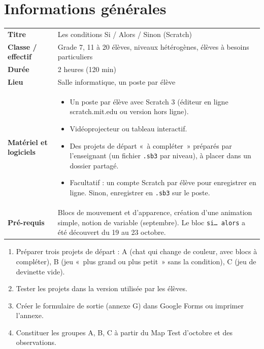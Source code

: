 \documentclass[11pt,a4paper]{article}
\begin{document}

\section{Informations générales}
\begin{tabularx}{\linewidth}{>{\bfseries}p{3.6cm}Y}
\toprule
Titre & Les conditions Si / Alors / Sinon (Scratch)\\
Classe / effectif & Grade 7, 11 à 20 élèves, niveaux hétérogènes, élèves à besoins particuliers\\
Durée & 2 heures (120 min)\\
Lieu & Salle informatique, un poste par élève\\
Matériel et logiciels &
\begin{itemize}
 \item Un poste par élève avec Scratch 3 (éditeur en ligne scratch.mit.edu ou version hors ligne).
 \item Vidéoprojecteur ou tableau interactif.
 \item Des projets de départ «~à compléter~» préparés par l'enseignant (un fichier \texttt{.sb3} par niveau), à placer dans un dossier partagé.
 \item Facultatif : un compte Scratch par élève pour enregistrer en ligne. Sinon, enregistrer en \texttt{.sb3} sur le poste.
\end{itemize}\\
Pré-requis &
Blocs de mouvement et d'apparence, création d'une animation simple, notion de variable (septembre). Le bloc \texttt{si\ldots{} alors} a été découvert du 19 au 23 octobre.\\
\bottomrule
\end{tabularx}

\begin{astuce}
\begin{enumerate}
 \item Préparer trois projets de départ : A (chat qui change de couleur, avec blocs à compléter), B (jeu «~plus grand ou plus petit~» sans la condition), C (jeu de devinette vide).
 \item Tester les projets dans la version utilisée par les élèves.
 \item Créer le formulaire de sortie (annexe G) dans Google Forms ou imprimer l'annexe.
 \item Constituer les groupes A, B, C à partir du Map Test d'octobre et des observations.
\end{enumerate}
\end{astuce}
\end{document}
